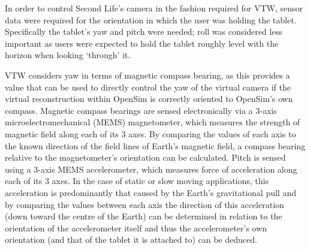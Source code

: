 \label{OrientationControl}

\newcommand{\ArduinoFootnote}{\footnote{\url{http://www.arduino.cc/}}}

\newcommand{\MMAfootnote}{\footnote{\url{http://cache.freescale.com/files/sensors/doc/data_sheet/MMA8452Q.pdf}}}

\newcommand{\ADXLfootnote}{\footnote{\url{http://www.analog.com/static/imported-files/data_sheets/ADXL335.pdf}}}

\newcommand{\HMCfootnote}{\footnote{\url{http://www51.honeywell.com/aero/common/documents/myaerospacecatalog-documents/Defense_Brochures-documents/HMC5883L_3-Axis_Digital_Compass_IC.pdf}}}

\newcommand{\HMCtwoFootnote}{\footnote{\url{http://www51.honeywell.com/aero/common/documents/myaerospacecatalog-documents/Missiles-Munitions/HMC6343.pdf}}}

\newcommand{\HMCvccFootnote}{\footnote{The HMC6343 requires 2.7 to 3.6V input on VCC/VDD, this table showing connection to 5V assumes a HMC6343 breakout with appropriate step down.}}

\newcommand{\itwocFootnote}{\footnote{The HMC6343's I2C lines must be pulled up to 3.3V, this table shows connection to an Arduino Uno R3's I2C lines which are pulled up to 5V assuming a HMC6343 breakout with appropriate level shifters.}}



In order to control Second Life's camera in the fashion required for VTW, sensor data were required for the orientation in which the user was holding the tablet. Specifically the tablet's yaw and pitch were needed; roll was considered less important as users were expected to hold the tablet roughly level with the horizon when looking `through' it.

VTW considers yaw in terms of magnetic compass bearing, as this provides a value that can be used to directly control the yaw of the virtual camera if the virtual reconstruction within OpenSim is correctly oriented to OpenSim's own compass. Magnetic compass bearings are sensed electronically via a 3-axis microelectromechanical (MEMS) magnetometer, which measures the strength of magnetic field along each of its 3 axes. By comparing the values of each axis to the known direction of the field lines of Earth's magnetic field, a compass bearing relative to the magnetometer's orientation can be calculated. Pitch is sensed using a 3-axis MEMS accelerometer, which measures force of acceleration along each of its 3 axes. In the case of static or slow moving applications, this acceleration is predominantly that caused by the Earth's gravitational pull and by comparing the values between each axis the direction of this acceleration (down toward the centre of the Earth) can be determined in relation to the orientation of the accelerometer itself and thus the accelerometer's own orientation (and that of the tablet it is attached to) can be deduced.

